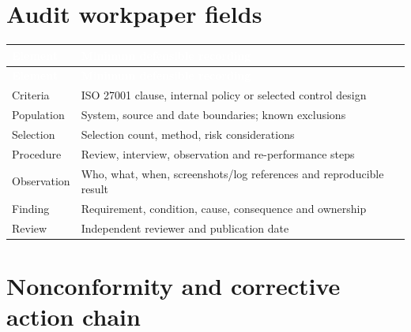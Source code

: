 \documentclass[11pt,letterpaper]{article}
\begin{document}
\section{Audit workpaper fields}
\small{}\begin{longtable}{>{\raggedright\arraybackslash}p{}>{\raggedright\arraybackslash}p{}}
\rowcolor{navy} \textcolor{white}{\textbf{Element}} & \textcolor{white}{\textbf{Minimum defensible recording}}\\
\endfirsthead
\rowcolor{navy} \textcolor{white}{\textbf{Element}} & \textcolor{white}{\textbf{Minimum defensible recording}}\\
\endhead
Criteria & ISO 27001 clause, internal policy or selected control design\\
Population & System, source and date boundaries; known exclusions\\
Selection & Selection count, method, risk considerations\\
Procedure & Review, interview, observation and re-performance steps\\
Observation & Who, what, when, screenshots/log references and reproducible result\\
Finding & Requirement, condition, cause, consequence and ownership\\
Review & Independent reviewer and publication date\\
\end{longtable}\normalsize

\section{Nonconformity and corrective action chain}
\begin{center}\end{center}
\end{document}
